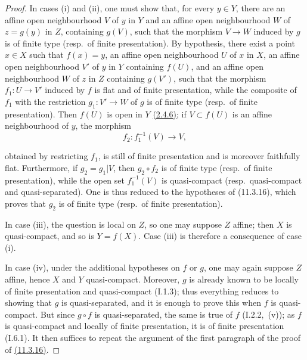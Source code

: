 \begin{proof}
In cases (i) and (ii), one must show that, for every $y\in Y$, there are an affine open neighbourhood $V$ of $y$ in $Y$ and an affine open neighbourhood $W$ of $z=g(y)$ in $Z$, containing $g(V)$, such that the morphism $V\to W$ induced by $g$ is of finite type (resp.\ of finite presentation).
By hypothesis, there exist a point $x\in X$ such that $f(x)=y$, an affine open neighbourhood $U$ of $x$ in $X$, an affine open neighbourhood $V'$ of $y$ in $Y$ containing $f(U)$, and an affine open neighbourhood $W$ of $z$ in $Z$ containing $g(V')$, such that the morphism $f_1:U\to V'$ induced by $f$ is flat and of finite presentation, while the composite of $f_1$ with the restriction $g_1:V'\to W$ of $g$ is of finite type (resp.\ of finite presentation).
Then $f(U)$ is open in $Y$ {\hyperlink{ega4.c04.thm.2-4-6}{(2.4.6)}}; if $V\subset f(U)$ is an affine neighbourhood of $y$, the morphism
\[
f_2:f_1^{-1}(V)\longrightarrow V,
\]


obtained by restricting $f_1$, is still of finite presentation and is moreover faithfully flat.
Furthermore, if $g_2=g_1|V$, then $g_2\circ f_2$ is of finite type (resp.\ of finite presentation), while the open set $f_1^{-1}(V)$ is quasi-compact (resp.\ quasi-compact and quasi-separated).
One is thus reduced to the hypotheses of (11.3.16), which proves that $g_2$ is of finite type (resp.\ of finite presentation).

In case (iii), the question is local on $Z$, so one may suppose $Z$ affine; then $X$ is quasi-compact, and so is $Y=f(X)$.
Case (iii) is therefore a consequence of case (i).

In case (iv), under the additional hypotheses on $f$ or $g$, one may again suppose $Z$ affine, hence $X$ and $Y$ quasi-compact.
Moreover, $g$ is already known to be locally of finite presentation and quasi-compact (I.1.3); thus everything reduces to showing that $g$ is quasi-separated, and it is enough to prove this when $f$ is quasi-compact.
But since $g\circ f$ is quasi-separated, the same is true of $f$ (I.2.2,~(v)); as $f$ is quasi-compact and locally of finite presentation, it is of finite presentation (I.6.1).
It then suffices to repeat the argument of the first paragraph of the proof of {\hyperlink{ega4.c04.prop.11-3-16}{(11.3.16)}}.
\end{proof}

